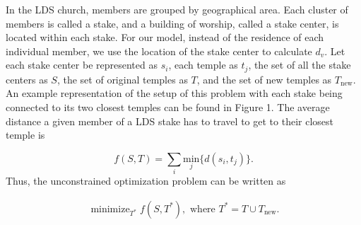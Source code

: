 \documentclass[twoside,twocolumn]{article}
\DeclareMathOperator*{\minimize}{minimize}
\begin{document}
In the LDS church, members are grouped by geographical area.
Each cluster of members is called a stake, and a building of worship, called a stake center, is located within each stake.
For our model, instead of the residence of each individual member, we use the location of the stake center to calculate $d_{v}$.
Let each stake center be represented as $s_i$, each temple as $t_j$, the set of all the stake centers as $S$, the set of original temples as $T$, and the set of new temples as $T_{\text{new}}$. %
An example representation of the setup of this problem with each stake being connected to its two closest temples can be found in Figure 1.
The average distance a given member of a LDS stake has to travel to get to their closest temple is

\begin{equation}
	f(S,T) = \sum_i \underset{j}{\text{min}}\{d(s_i,t_j)\}.
\end{equation}
Thus, the unconstrained optimization problem can be written as

\begin{equation}
\begin{aligned}
	\minimize_{T^*} f(S,T^*), \text{ where } T^* = T \cup T_{\text{new}}.
\end{aligned}
\end{equation}
\end{document}

